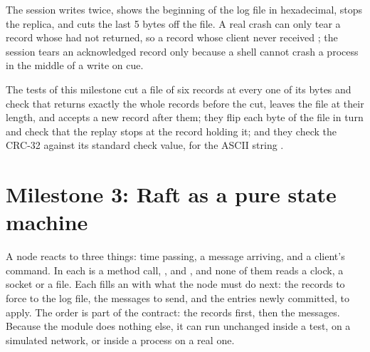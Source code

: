 \label{lst:b3:project-replicated-store:wal}

The session writes twice, shows the beginning of the log file in hexadecimal, stops the replica, and cuts the last 5 bytes off the file. A real crash can only tear a record whose  had not returned, so a record whose client never received ; the session tears an acknowledged record only because a shell cannot crash a process in the middle of a write on cue.

\label{out:b3:project-replicated-store:m2}

The tests of this milestone cut a file of six records at every one of its bytes and check that  returns exactly the whole records before the cut, leaves the file at their length, and accepts a new record after them; they flip each byte of the file in turn and check that the replay stops at the record holding it; and they check the CRC-32 against its standard check value,  for the ASCII string .

\section{Milestone 3: Raft as a pure state machine}\label{sec:b3:project-replicated-store:raft}

A  node reacts to three things: time passing, a message arriving, and a client's command. In  each is a method call, ,  and , and none of them reads a clock, a socket or a file. Each fills an  with what the node must do next: the records to force to the log file, the messages to send, and the entries newly committed, to apply. The order is part of the contract: the records first, then the messages. Because the module does nothing else, it can run unchanged inside a test, on a simulated network, or inside a process on a real one.

